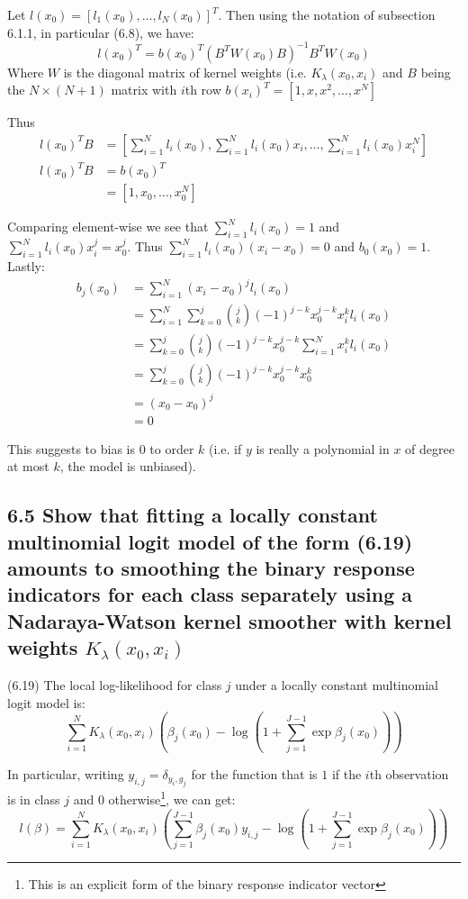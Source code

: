 Let $l(x_0) = [l_1(x_0), \dots , l_N(x_0)]^T$. Then using the notation of subsection 6.1.1, in particular (6.8), we have:
$$ l(x_0)^T = b(x_0)^T \left(B^T W(x_0) B \right)^{-1} B^T W(x_0)$$
Where $W$ is the diagonal matrix of kernel weights (i.e. $K_\lambda(x_0, x_i)$ and $B$ being the $N\times (N+1)$ matrix with $i$th row $b(x_i)^T = [1,x,x^2,\dots,x^N]$

Thus 
\begin{align*}
    l(x_0)^T B &= [\sum_{i=1}^N l_i(x_0), \sum_{i=1}^N l_i(x_0) x_i , \dots, \sum_{i=1}^N l_i(x_0) x_i^N ] \\
    l(x_0)^T B &= b(x_0)^T \\
    &= [1, x_0, \dots, x_0^N]
\end{align*}

Comparing element-wise we see that $\sum_{i=1}^N l_i(x_0) = 1$ and $\sum_{i=1}^N l_i(x_0) x_i^j = x_0^j$.
Thus $\sum_{i=1}^N l_i(x_0) (x_i - x_0) = 0$ and $b_0(x_0) = 1$.
Lastly:
\begin{align*}
    b_j(x_0) &= \sum_{i=1}^N (x_i - x_0)^j l_i(x_0) \\
    &= \sum_{i=1}^N \sum_{k=0}^j {j \choose k} (-1) ^{j-k} x_0^{j-k} x_i^k l_i(x_0) \\
    &= \sum_{k=0}^j {j \choose k} (-1) ^{j-k} x_0^{j-k} \sum_{i=1}^N x_i^k l_i(x_0) \\ 
    &= \sum_{k=0}^j {j \choose k} (-1) ^{j-k} x_0^{j-k} x_0^k \\ 
    &= (x_0 - x_0)^j \\
    &= 0
\end{align*}

This suggests to bias is $0$ to order $k$ (i.e. if $y$ is really a polynomial in $x$ of degree at most $k$, the model is unbiased).

\subsection*{6.5 Show that fitting a locally constant multinomial logit model of the form (6.19) amounts to smoothing the binary response indicators for each class separately using a Nadaraya-Watson kernel smoother with kernel weights $K_\lambda(x_0, x_i)$}

(6.19) The local log-likelihood for class $j$ under a locally constant multinomial logit model is:
$$ \sum_{i=1}^N K_\lambda (x_0, x_i) \left( \beta_j(x_0) - \log\left( 1 + \sum_{j=1}^{J-1} \exp{\beta_j(x_0)}\right) \right)$$

In particular, writing $y_{i,j} = \delta_{y_i, g_j}$ for the function that is $1$ if the $i$th observation is in class $j$ and $0$ otherwise\footnote{This is an explicit form of the binary response indicator vector}, we can get:
$$l(\beta) = \sum_{i=1}^N K_\lambda (x_0, x_i) \left( \sum_{j=1}^{J-1} \beta_j(x_0) y_{i,j} - \log\left( 1 + \sum_{j=1}^{J-1} \exp{\beta_j(x_0)}\right) \right)$$


